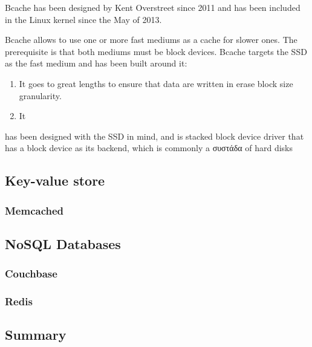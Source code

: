 Bcache has been designed by Kent Overstreet since 2011 and has been included in 
the Linux kernel since the May of 2013.

Bcache allows to use one or more fast mediums as a cache for slower ones. The 
prerequisite is that both mediums must be block devices. Bcache targets the SSD  
as the fast medium and has been built around it:

\begin{enumerate}
	\item It goes to great lengths to ensure that data are written in erase 
		block size granularity.
	\item It
\end{enumerate}

has been designed with the SSD in mind, and is stacked block device driver that 
has a block device as its backend, which is commonly a συστάδα of hard disks

\subsection{Key-value store}

\subsubsection{Memcached}

\subsection{NoSQL Databases}

\subsubsection{Couchbase}

\subsubsection{Redis}

\subsection{Summary}





